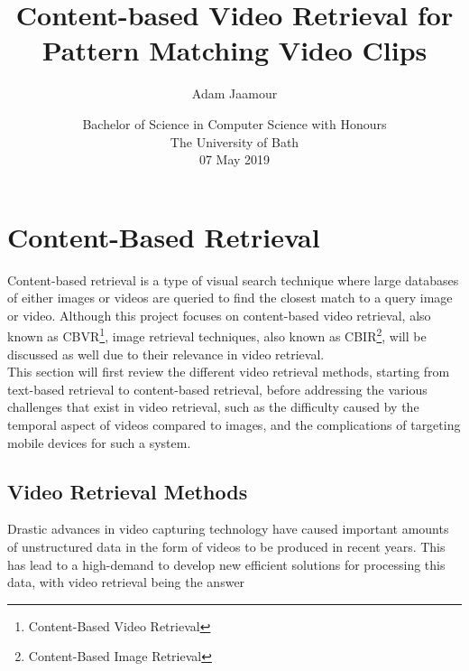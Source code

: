 \documentclass[11pt,openany,a4paper]{article}
\title{
    Content-based Video Retrieval for Pattern Matching Video Clips\\
}
\author{Adam Jaamour}
\date{Bachelor of Science in Computer Science with Honours\\The University of Bath\\07 May 2019}
\begin{document}
\maketitle
\thispagestyle{empty}
\newpage

\tableofcontents
\newpage

\setcounter{page}{1}


\section{Content-Based Retrieval}

Content-based retrieval is a type of visual search technique where large databases of either images or videos are queried to find the closest match to a query image or video. Although this project focuses on content-based video retrieval, also known as CBVR\footnote{Content-Based Video Retrieval}, image retrieval techniques, also known as CBIR\footnote{Content-Based Image Retrieval}, will be discussed as well due to their relevance in video retrieval.\\

This section will first review the different video retrieval methods, starting from text-based retrieval to content-based retrieval, before addressing the various challenges that exist in video retrieval, such as the difficulty caused by the temporal aspect of videos compared to images, and the complications of targeting mobile devices for such a system.


\subsection{Video Retrieval Methods}
\label{sec:cbvr-methods}

Drastic advances in video capturing technology have caused important amounts of unstructured data in the form of videos to be produced in recent years. This has lead to a high-demand to develop new efficient solutions for processing this data, with video retrieval being the answer \\
\end{document}
